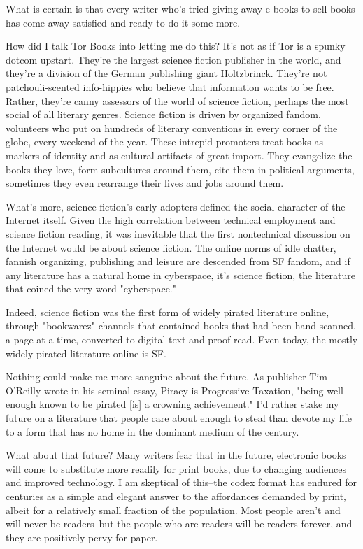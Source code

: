 What is certain is that every writer who's tried giving away
e-books to sell books has come away satisfied and ready to do it
some more.

How did I talk Tor Books into letting me do this? It's not as if
Tor is a spunky dotcom upstart. They're the largest science fiction
publisher in the world, and they're a division of the German
publishing giant Holtzbrinck. They're not patchouli-scented
info-hippies who believe that information wants to be free. Rather,
they're canny assessors of the world of science fiction, perhaps
the most social of all literary genres. Science fiction is driven
by organized fandom, volunteers who put on hundreds of literary
conventions in every corner of the globe, every weekend of the
year. These intrepid promoters treat books as markers of identity
and as cultural artifacts of great import. They evangelize the
books they love, form subcultures around them, cite them in
political arguments, sometimes they even rearrange their lives and
jobs around them.

What's more, science fiction's early adopters defined the social
character of the Internet itself. Given the high correlation
between technical employment and science fiction reading, it was
inevitable that the first nontechnical discussion on the Internet
would be about science fiction. The online norms of idle chatter,
fannish organizing, publishing and leisure are descended from SF
fandom, and if any literature has a natural home in cyberspace,
it's science fiction, the literature that coined the very word
"cyberspace."

Indeed, science fiction was the first form of widely pirated
literature online, through "bookwarez" channels that contained
books that had been hand-scanned, a page at a time, converted to
digital text and proof-read. Even today, the mostly widely pirated
literature online is SF.

Nothing could make me more sanguine about the future. As publisher
Tim O'Reilly wrote in his seminal essay, Piracy is Progressive
Taxation, "being well-enough known to be pirated [is] a crowning
achievement." I'd rather stake my future on a literature that
people care about enough to steal than devote my life to a form
that has no home in the dominant medium of the century.

What about that future? Many writers fear that in the future,
electronic books will come to substitute more readily for print
books, due to changing audiences and improved technology. I am
skeptical of this--the codex format has endured for centuries as a
simple and elegant answer to the affordances demanded by print,
albeit for a relatively small fraction of the population. Most
people aren't and will never be readers--but the people who are
readers will be readers forever, and they are positively pervy for
paper.

